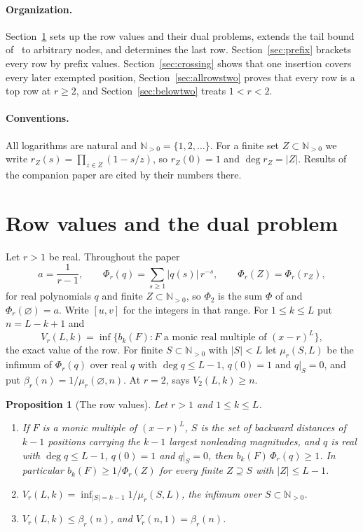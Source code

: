 \documentclass[11pt]{article}
\newtheorem{proposition}[theorem]{Proposition}
\newcommand{\N}{\mathbb N}
\begin{document}
\paragraph{Organization.}
Section~\ref{sec:rowvalues} sets up the row values and their dual
problems, extends the tail bound of~\cite{coefficient-mass} to arbitrary
nodes, and determines the last row.  Section~\ref{sec:prefix} brackets
every row by prefix values.  Section~\ref{sec:crossing} shows that one
insertion covers every later exempted position,
Section~\ref{sec:allrowstwo} proves that every row is a top row at
$r\ge2$, and Section~\ref{sec:belowtwo} treats $1<r<2$.

\paragraph{Conventions.}
All logarithms are natural and $\N_{>0}=\{1,2,\ldots\}$.  For a finite set
$Z\subset\N_{>0}$ we write $r_Z(s)=\prod_{z\in Z}(1-s/z)$, so $r_Z(0)=1$
and $\deg r_Z=|Z|$.  Results of the companion paper are cited by their
numbers there.

\section{Row values and the dual problem}\label{sec:rowvalues}

Let $r>1$ be real.  Throughout the paper
\[
  a=\frac1{r-1},\qquad
  \Phi_r(q)=\sum_{s\ge1}|q(s)|\,r^{-s},\qquad
  \Phi_r(Z)=\Phi_r(r_Z),
\]
for real polynomials $q$ and finite $Z\subset\N_{>0}$, so $\Phi_2$ is the sum $\Phi$ of \cite[Section~4.4]{coefficient-mass} and
$\Phi_r(\varnothing)=a$.  Write $[u,v]$ for the integers in that range.  For
$1\le k\le L$ put $n=L-k+1$ and
\[
  V_r(L,k)=\inf\{b_k(F): F\text{ a monic real multiple of }(x-r)^L\},
\]
the exact value of the row.  For finite $S\subset\N_{>0}$ with $|S|<L$ let
$\mu_r(S,L)$ be the infimum of $\Phi_r(q)$ over real $q$ with $\deg q\le L-1$,
$q(0)=1$ and $q|_S=0$, and put $\beta_r(n)=1/\mu_r(\varnothing,n)$.  At
$r=2$, \cite[Theorem~4.13]{coefficient-mass} says $V_2(L,k)\ge n$.

\begin{proposition}[The row values]\label{prop:rowvalue}
Let $r>1$ and $1\le k\le L$.
\begin{enumerate}
\item[(a)] If $F$ is a monic multiple of $(x-r)^L$, $S$ is the set of
backward distances of $k-1$ positions carrying the $k-1$ largest nonleading
magnitudes, and $q$ is real with $\deg q\le L-1$, $q(0)=1$ and $q|_S=0$, then
$b_k(F)\,\Phi_r(q)\ge1$.  In particular $b_k(F)\ge1/\Phi_r(Z)$ for every
finite $Z\supseteq S$ with $|Z|\le L-1$.
\item[(b)] $V_r(L,k)=\inf_{|S|=k-1}1/\mu_r(S,L)$, the infimum over
$S\subset\N_{>0}$.
\item[(c)] $V_r(L,k)\le\beta_r(n)$, and $V_r(n,1)=\beta_r(n)$.
\end{enumerate}
\end{proposition}
\end{document}
